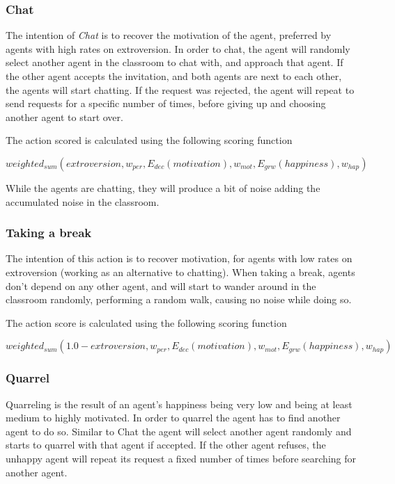\subsubsection{Chat}
The intention of \textit{Chat} is to recover the motivation of the agent, preferred
by agents with high rates on extroversion. In order to chat, the agent will
randomly select another agent in the classroom to chat with, and approach that agent.
If the other agent accepts the invitation, and both agents are next to each other,
the agents will start chatting. If the request was rejected, the agent will repeat
to send requests for a specific number of times, before giving up and choosing
another agent to start over.

The action scored is calculated using the following scoring function

\begin{equation}
    weighted_{sum}(extroversion, w_{per}, E_{dec}(motivation), w_{mot}, E_{grw}(happiness), w_{hap})
\end{equation}

While the agents are chatting, they will produce a bit of noise adding the
accumulated noise in the classroom.

\subsubsection{Taking a break}
The intention of this action is to recover motivation, for agents
with low rates on extroversion (working as an alternative to chatting).
When taking a break, agents don't depend on any other agent, and will start to
wander around in the classroom randomly, performing a random walk, causing no noise
while doing so.

The action score is calculated using the following scoring function

\begin{equation}
    weighted_{sum}(1.0 - extroversion, w_{per}, E_{dec}(motivation), w_{mot}, E_{grw}(happiness), w_{hap})
\end{equation}

\subsubsection{Quarrel}
Quarreling is the result of an agent's happiness being very low and being at least
medium to highly motivated. In order to quarrel the agent has to find another agent
to do so. Similar to Chat the agent will select another agent randomly and starts
to quarrel with that agent if accepted. If the other agent refuses, the unhappy
agent will repeat its request a fixed number of times before searching for another agent.

